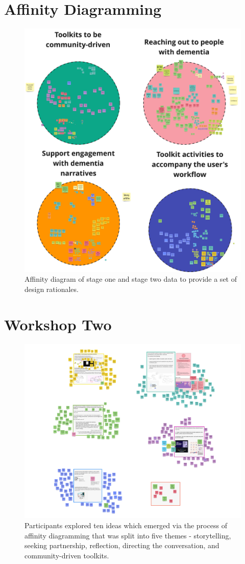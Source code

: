 \section{Affinity Diagramming}
\label{app:AD}
\begin{figure}[htp]
    \centering
    \includegraphics[width=0.8\linewidth]{Images/Appendix/D3Toolkit/Affinity-Diagram.jpg}
    
    \caption{Affinity diagram of stage one and stage two data to provide a set of design rationales.}
    \label{fig:App:AffinityDiagram}
\end{figure}

\newpage
\section{Workshop Two}
\label{D3:W2}
\begin{figure}[htp]
    \centering
    \includegraphics[width=0.8\linewidth]{Images/Appendix/D3Toolkit/Workshop2-Example.jpg}
    \caption{Participants explored ten ideas which emerged via the process of affinity diagramming that was split into five themes - storytelling, seeking partnership, reflection, directing the conversation, and community-driven toolkits.}
    \label{fig:App:W2-Example}
\end{figure}

